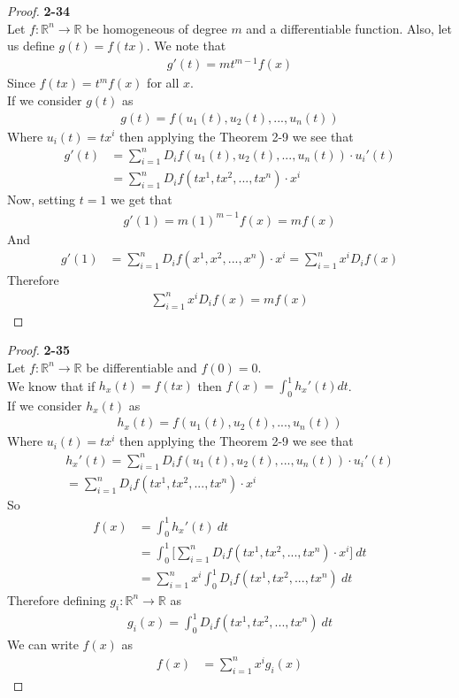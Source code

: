 \documentclass[11pt]{article}
\newcommand{\R}{\mathbb{R}}
\theoremstyle{definition}
\begin{document}
\cleardoublepage
\begin{proof}{\textbf{2-34}}\\
Let $f:\R^n \to \R$ be homogeneous of degree $m$ and a differentiable function.
Also, let us define $g(t) = f(tx)$. We note that
\begin{align*}
    g'(t) = m t^{m-1} f(x)
\end{align*}
Since $f(tx) = t^m f(x)$ for all $x$.\\
If we consider $g(t)$ as
\begin{align*}
    g(t) = f(u_1(t), u_2(t), ..., u_n(t))
\end{align*}
Where $u_i(t) = tx^i$ then applying the Theorem 2-9 we see that
\begin{align*}
    g'(t) &= \sum_{i=1}^n D_if(u_1(t), u_2(t), ..., u_n(t)) \cdot u_i'(t)\\
    &= \sum_{i=1}^n D_if(tx^1, tx^2, ..., tx^n) \cdot x^i
\end{align*}
Now, setting $t = 1$ we get that
\begin{align*}
    g'(1) = m (1)^{m-1} f(x) = mf(x)
\end{align*}
And
\begin{align*}
    g'(1) &= \sum_{i=1}^n D_if(x^1, x^2, ..., x^n) \cdot x^i
    = \sum_{i =1}^n x^i D_i f(x)
\end{align*}
Therefore
\begin{align*}
    \sum_{i =1}^n x^i D_i f(x) = mf(x)
\end{align*}
\end{proof}

\cleardoublepage
\begin{proof}{\textbf{2-35}}\\
Let $f:\R^n \to \R$ be differentiable and $f(0) = 0$.\\
We know that if $h_x(t) = f(tx)$ then $f(x) = \int_0^1 h_x'(t) dt$.\\
If we consider $h_x(t)$ as
\begin{align*}
    h_x(t) = f(u_1(t), u_2(t),..., u_n(t))
\end{align*}
Where $u_i(t) = tx^i$ then applying the Theorem 2-9 we see that
\begin{align*}
    h_x'(t) = \sum_{i=1}^n D_if(u_1(t), u_2(t), ..., u_n(t))\cdot u_i'(t)\\
    = \sum_{i=1}^n D_if(tx^1, tx^2, ..., tx^n)\cdot x^i
\end{align*}
So
\begin{align*}
    f(x) &= \int_0^1 h_x'(t)~dt\\
    &= \int_0^1 \bigg[\sum_{i=1}^n D_if(tx^1, tx^2, ..., tx^n)\cdot x^i\bigg]~dt\\
    &= \sum_{i=1}^n x^i \int_0^1 D_if(tx^1, tx^2, ..., tx^n)~dt
\end{align*}
Therefore defining $g_i:\R^n \to \R$ as
\begin{align*}
    g_i(x) = \int_0^1 D_if(tx^1, tx^2, ..., tx^n)~dt
\end{align*}
We can write $f(x)$ as
\begin{align*}
    f(x) &= \sum_{i=1}^n x^i g_i(x)
\end{align*}
\end{proof}
\end{document}
